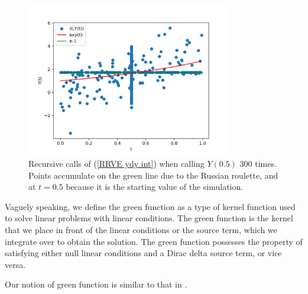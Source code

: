 \documentclass[a4paper,12pt]{article}
\begin{document}
\begin{example}[$y'=y$ average condition]
    \begin{figure}[h!]
        \centering
        \includegraphics[width=0.8\textwidth]{plots/ydy int.png}
        \caption{Recursive calls of (\ref{RRVE ydy int}) when
            calling $Y(0.5)$ $300$ times. Points accumulate on
            the green line due to the Russian roulette,
            and at  $t=0.5$ because it is the starting
            value of the simulation.
        }
        \label{fig:ydy int}
    \end{figure}

\end{example}

\begin{definition}
    Vaguely speaking, we define the green function as a type
    of kernel function used to solve linear problems with linear
    conditions. The green function is the kernel that we
    place in front of the linear conditions or the source term,
    which we integrate over to obtain the solution. The green
    function possesses the property of satisfying either null
    linear conditions and a Dirac delta source term, or vice versa.
\end{definition}

\begin{related}
    Our notion of green function is similar to that in \cite{hwang_simulationtabulation_2001}.
\end{related}


\end{document}
